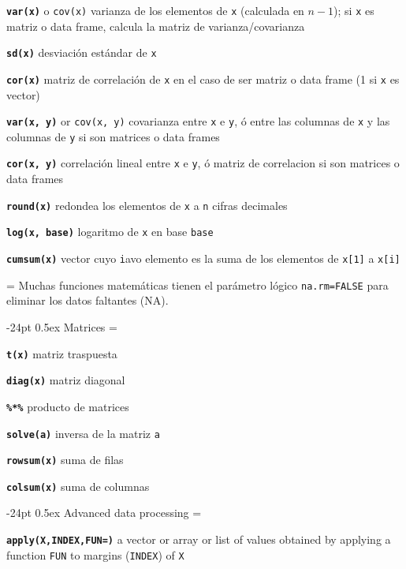 \documentclass[10pt,landscape]{article}
\makeatletter
\renewcommand\section{\@startsection{section}{1}{0mm}%
                                     {-24pt}%
                                     {0.5ex}%
                                {\color[rgb]{1,0.54902,0}\normalfont\large\bfseries}}
\newcommand{\code}{\texttt}
\newcommand{\bcode}[1]{\texttt{\textbf{#1}}}
\makeatother
\begin{document}
\begin{multicols*}{3}
\bcode{var(x)} o \code{cov(x)}  varianza de los elementos de \code{x}
(calculada en $n-1$); si \code{x} es matriz o data frame, calcula la matriz de varianza/covarianza

\bcode{sd(x)} desviación estándar de \code{x}

\bcode{cor(x)}  matriz de correlación de \code{x} en el caso de ser matriz o data frame (1 si \code{x} es vector)

\bcode{var(x, y)} or \code{cov(x, y)}  covarianza entre \code{x} e \code{y}, ó entre las columnas de \code{x} y las columnas de \code{y} si son matrices o data frames

\bcode{cor(x, y)}  correlación lineal entre \code{x} e \code{y}, ó matriz de correlacion si son matrices o data frames

\bcode{round(x)} redondea los elementos de \code{x} a \code{n} cifras decimales

\bcode{log(x, base)} logaritmo de \code{x} en base \code{base}

\bcode{cumsum(x)} vector cuyo \code{i}avo elemento es la suma de los elementos de \code{x[1]} a \code{x[i]}

\everypar={\hangindent=0mm}
Muchas funciones matemáticas tienen el parámetro lógico \code{na.rm=FALSE} para eliminar los datos faltantes (NA).




\section{Matrices}
\everypar={\hangindent=9mm}

\bcode{t(x)} matriz traspuesta

\bcode{diag(x)} matriz diagonal

\bcode{\%*\%} producto de matrices

\bcode{solve(a)} inversa de la matriz \code{a}

\bcode{rowsum(x)} suma de filas

\bcode{colsum(x)} suma de columnas 






\section{Advanced data processing}
\everypar={\hangindent=9mm}

\bcode{apply(X,INDEX,FUN=)} a vector or array or list of values obtained by applying a
     function \code{FUN} to margins (\code{INDEX}) of \code{X}


\end{multicols*}
\end{document}
